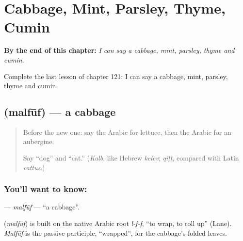 
\chapter{Cabbage, Mint, Parsley, Thyme, Cumin}
\label{ch:ar-cabbage-mint-parsley-thyme-cumin}

\begin{chapteropening}
\textbf{By the end of this chapter:} \emph{I can say a cabbage, mint, parsley, thyme and cumin.}

Complete the last lesson of chapter 121: I can say a cabbage, mint, parsley, thyme and cumin.
\end{chapteropening}

\section[\texorpdfstring{\ar{ملفوف} (malfūf)}{ملفوف (malfūf)}]{ (malfūf) — a cabbage}

\label{lesson:AR-C121-malfuf}



\begin{quote}
Before the new one: say the Arabic for lettuce, then the Arabic for an aubergine.

Say \textquotedblleft{}dog\textquotedblright{} and \textquotedblleft{}cat.\textquotedblright{} (\emph{Kalb}, like Hebrew \emph{kelev}; \emph{qiṭṭ}, compared with Latin \emph{cattus}.)
\end{quote}

\subsection*{You'll want to know: }
\textbf{} — \emph{malfūf} — \textquotedblleft{}a cabbage\textquotedblright{}.

\begin{cousinweb}
\textbf{} (\emph{malfūf}) is built on the native Arabic root \emph{l-f-f}, \textquotedblleft{}to wrap, to roll up\textquotedblright{} (Lane). \emph{Malfūf} is the passive participle, \textquotedblleft{}wrapped\textquotedblright{}, for the cabbage's folded leaves.
\end{cousinweb}

